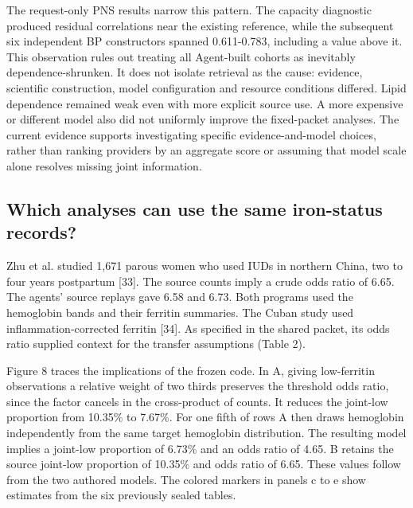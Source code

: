 \documentclass[11pt,letterpaper]{article}
\begin{document}
The request-only PNS results narrow this pattern. The capacity diagnostic produced residual correlations near the existing reference, while the subsequent six independent BP constructors spanned 0.611-0.783, including a value above it. This observation rules out treating all Agent-built cohorts as inevitably dependence-shrunken. It does not isolate retrieval as the cause: evidence, scientific construction, model configuration and resource conditions differed. Lipid dependence remained weak even with more explicit source use. A more expensive or different model also did not uniformly improve the fixed-packet analyses. The current evidence supports investigating specific evidence-and-model choices, rather than ranking providers by an aggregate score or assuming that model scale alone resolves missing joint information.


\subsection{Which analyses can use the same iron-status records?}

Zhu et al. studied 1,671 parous women who used IUDs in northern China, two to four years postpartum [33]. The source counts imply a crude odds ratio of 6.65. The agents' source replays gave 6.58 and 6.73. Both programs used the hemoglobin bands and their ferritin summaries. The Cuban study used inflammation-corrected ferritin [34]. As specified in the shared packet, its odds ratio supplied context for the transfer assumptions (Table 2).


Figure 8 traces the implications of the frozen code. In A, giving low-ferritin observations a relative weight of two thirds preserves the threshold odds ratio, since the factor cancels in the cross-product of counts. It reduces the joint-low proportion from 10.35\% to 7.67\%. For one fifth of rows A then draws hemoglobin independently from the same target hemoglobin distribution. The resulting model implies a joint-low proportion of 6.73\% and an odds ratio of 4.65. B retains the source joint-low proportion of 10.35\% and odds ratio of 6.65. These values follow from the two authored models. The colored markers in panels c to e show estimates from the six previously sealed tables.
\end{document}
